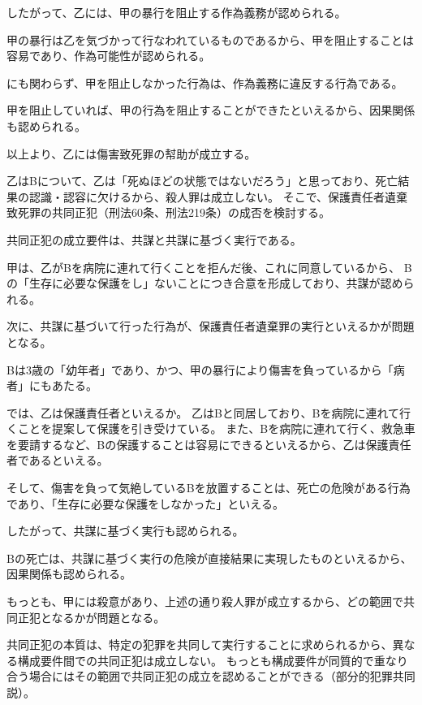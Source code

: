 \documentclass[11pt]{jsarticle}
\begin{document}
		したがって、乙には、甲の暴行を阻止する作為義務が認められる。
		
		\sectionC{}
		甲の暴行は乙を気づかって行なわれているものであるから、甲を阻止することは容易であり、作為可能性が認められる。
		
		にも関わらず、甲を阻止しなかった行為は、作為義務に違反する行為である。
		
		\sectionC{}
		甲を阻止していれば、甲の行為を阻止することができたといえるから、因果関係も認められる。
		
		以上より、乙には傷害致死罪の幇助が成立する。
	
	乙はBについて、乙は「死ぬほどの状態ではないだろう」と思っており、死亡結果の認識・認容に欠けるから、殺人罪は成立しない。
	そこで、保護責任者遺棄致死罪の共同正犯（刑法60条、刑法219条）の成否を検討する。
	
	共同正犯の成立要件は、共謀と共謀に基づく実行である。
	
		\sectionC{}

		甲は、乙がBを病院に連れて行くことを拒んだ後、これに同意しているから、
		Bの「生存に必要な保護をし」ないことにつき合意を形成しており、共謀が認められる。
		
		\sectionC{}
		次に、共謀に基づいて行った行為が、保護責任者遺棄罪の実行といえるかが問題となる。
		
			\sectionD{}
			Bは3歳の「幼年者」であり、かつ、甲の暴行により傷害を負っているから「病者」にもあたる。
			
			\sectionD{}
			では、乙は保護責任者といえるか。
			乙はBと同居しており、Bを病院に連れて行くことを提案して保護を引き受けている。
			また、Bを病院に連れて行く、救急車を要請するなど、Bの保護することは容易にできるといえるから、乙は保護責任者であるといえる。
			
			そして、傷害を負って気絶しているBを放置することは、死亡の危険がある行為であり、「生存に必要な保護をしなかった」といえる。
			
			したがって、共謀に基づく実行も認められる。
	
		\sectionC{}
		Bの死亡は、共謀に基づく実行の危険が直接結果に実現したものといえるから、因果関係も認められる。
		
		\sectionC{}
		もっとも、甲には殺意があり、上述の通り殺人罪が成立するから、どの範囲で共同正犯となるかが問題となる。
		
		共同正犯の本質は、特定の犯罪を共同して実行することに求められるから、異なる構成要件間での共同正犯は成立しない。
		もっとも構成要件が同質的で重なり合う場合にはその範囲で共同正犯の成立を認めることができる（部分的犯罪共同説）。
		
\end{document}
